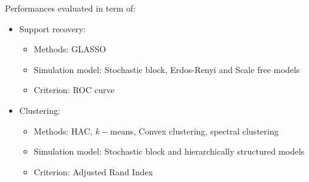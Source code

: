 \documentclass[11pt]{beamer}
\begin{document}
										\begin{frame}{}
											Performances evaluated in term of:
											\begin{itemize}
												\item Support recovery: 
												\begin{itemize}
													\item Methods: GLASSO
													\item Simulation model: Stochastic block, Erdos-Renyi and Scale free models
													\item Criterion: ROC curve 
												\end{itemize} 
												\item Clustering: 
												\begin{itemize}
													\item Methods: HAC, $k-$means, Convex clustering, spectral clustering 
													\item Simulation model: Stochastic block and hierarchically structured models 
													\item Criterion: Adjusted Rand Index
												\end{itemize}
											\end{itemize}
										\end{frame}
										
\end{document}
